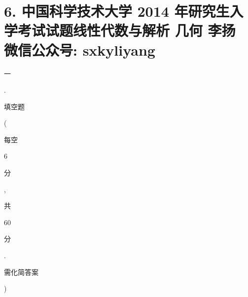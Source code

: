 \documentclass[10pt]{article}
\begin{document}
\section{6. 中国科学技术大学 2014 年研究生入学考试试题线性代数与解析 几何 
 李扬 
 微信公众号: sxkyliyang}
\begin{CJK}{UTF8}{mj}一\end{CJK}. \begin{CJK}{UTF8}{mj}填空题\end{CJK}(\begin{CJK}{UTF8}{mj}每空\end{CJK} 6 \begin{CJK}{UTF8}{mj}分\end{CJK}, \begin{CJK}{UTF8}{mj}共\end{CJK} 60 \begin{CJK}{UTF8}{mj}分\end{CJK}. \begin{CJK}{UTF8}{mj}需化简答案\end{CJK})
\end{document}
